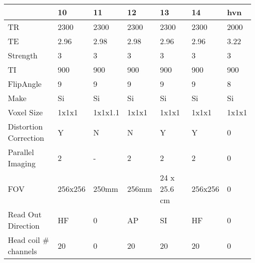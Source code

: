 \begin{table}
[]
\centering
\begin{tabular}{lllllll}
\toprule
{} & 10 & 11 & 12 & 13 & 14 & hvn \\
\midrule
TR                    &                 2300 &                 2300 &               2300 &                2300 &                2300 &                2000 \\
TE                    &                 2.96 &                 2.98 &               2.98 &                2.96 &                2.96 &                3.22 \\
Strength              &                    3 &                    3 &                  3 &                   3 &                   3 &                   3 \\
TI                    &                  900 &                  900 &                900 &                 900 &                 900 &                 900 \\
FlipAngle             &                    9 &                    9 &                  9 &                   9 &                   9 &                   8 \\
Make                  &                   Si &                   Si &                 Si &                  Si &                  Si &                  Si \\
Voxel Size            &                1x1x1 &              1x1x1.1 &              1x1x1 &               1x1x1 &               1x1x1 &               1x1x1 \\
Distortion Correction &                    Y &                    N &                  N &                   Y &                   Y &                   0 \\
Parallel Imaging      &                    2 &                    - &                  2 &                   2 &                   2 &                   0 \\
FOV                   &              256x256 &                250mm &              256mm &        24 x 25.6 cm &             256x256 &                   0 \\
Read Out Direction    &                   HF &                    0 &                 AP &                  SI &                  HF &                   0 \\
Head coil \# channels  &                   20 &                    0 &                 20 &                  20 &                  20 &                   0 \\

\end{tabular}
\end{table}
